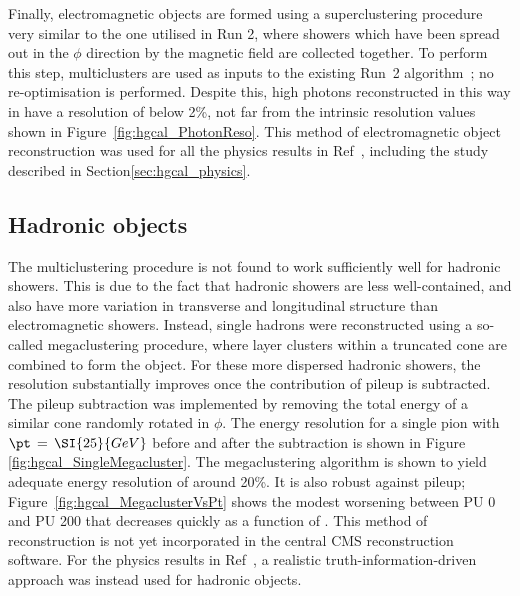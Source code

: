 Finally, electromagnetic objects are formed using a superclustering procedure very similar to the one utilised in Run 2, 
where showers which have been spread out in the $\phi$ direction by the magnetic field are collected together.
To perform this step, multiclusters are used as inputs to the existing Run~2 algorithm~\cite{PhotonReco}; no re-optimisation is performed.
Despite this, high \pt photons reconstructed in this way in have a resolution of below 2\%, 
not far from the intrinsic resolution values shown in Figure~\ref{fig:hgcal_PhotonReso}.
This method of electromagnetic object reconstruction was used for all the physics results in Ref~\cite{HGCAL}, 
including the study described in Section\ref{sec:hgcal_physics}.


\subsection{Hadronic objects}

The multiclustering procedure is not found to work sufficiently well for hadronic showers.
This is due to the fact that hadronic showers are less well-contained, and also have more variation in transverse and longitudinal structure than electromagnetic showers.
Instead, single hadrons were reconstructed using a so-called megaclustering procedure, where layer clusters within a truncated cone are combined to form the object. 
For these more dispersed hadronic showers, the resolution substantially improves once the contribution of pileup is subtracted.
The pileup subtraction was implemented by removing the total energy of a similar cone randomly rotated in $\phi$. 
The energy resolution for a single pion with $\pt\,=\,\SI{25}{GeV}$ before and after the subtraction is shown in Figure \ref{fig:hgcal_SingleMegacluster}. 
The megaclustering algorithm is shown to yield adequate energy resolution of around 20\%. 
It is also robust against pileup; Figure~\ref{fig:hgcal_MegaclusterVsPt} shows the modest worsening between PU 0 and PU 200 that decreases quickly as a function of \pt.
This method of reconstruction is not yet incorporated in the central CMS reconstruction software.
For the physics results in Ref~\cite{HGCAL}, a realistic truth-information-driven approach was instead used for hadronic objects.

